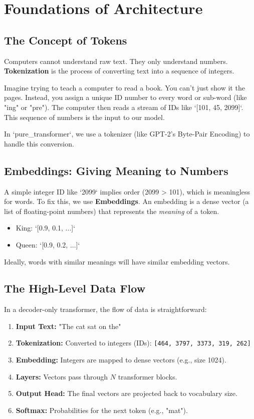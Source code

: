 \chapter{Foundations of Architecture}

\section{The Concept of Tokens}
Computers cannot understand raw text. They only understand numbers. \textbf{Tokenization} is the process of converting text into a sequence of integers.

\begin{tcolorbox}[colback=blue!5!white,colframe=blue!75!black,title=Analogy: The Language of Numbers]
Imagine trying to teach a computer to read a book. You can't just show it the pages. Instead, you assign a unique ID number to every word or sub-word (like "ing" or "pre"). The computer then reads a stream of IDs like `[101, 45, 2099]`. This sequence of numbers is the input to our model.
\end{tcolorbox}

In `pure_transformer`, we use a tokenizer (like GPT-2's Byte-Pair Encoding) to handle this conversion.

\section{Embeddings: Giving Meaning to Numbers}
A simple integer ID like `2099` implies order (2099 > 101), which is meaningless for words. To fix this, we use \textbf{Embeddings}.
An embedding is a dense vector (a list of floating-point numbers) that represents the \textit{meaning} of a token.
\begin{itemize}
    \item King: `[0.9, 0.1, ...]`
    \item Queen: `[0.9, 0.2, ...]`
\end{itemize}
Ideally, words with similar meanings will have similar embedding vectors.

\section{The High-Level Data Flow}
In a decoder-only transformer, the flow of data is straightforward:
\begin{enumerate}
    \item \textbf{Input Text:} "The cat sat on the"
    \item \textbf{Tokenization:} Converted to integers (IDs): \texttt{[464, 3797, 3373, 319, 262]}
    \item \textbf{Embedding:} Integers are mapped to dense vectors (e.g., size 1024).
    \item \textbf{Layers:} Vectors pass through $N$ transformer blocks.
    \item \textbf{Output Head:} The final vectors are projected back to vocabulary size.
    \item \textbf{Softmax:} Probabilities for the next token (e.g., "mat").
\end{enumerate}

